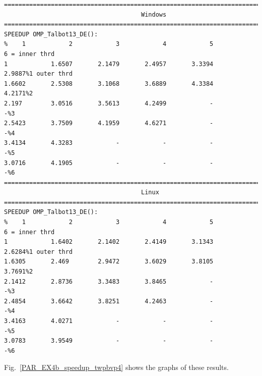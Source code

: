 \documentclass[a4paper,10pt]{report}%
\begin{document}
\begin{lstlisting}
====================================================================================
                                      Windows
====================================================================================
SPEEDUP OMP_Talbot13_DE():
%    1            2            3            4            5            6 = inner thrd
1            1.6507       2.1479       2.4957       3.3394       2.9887%1 outer thrd
1.6602       2.5308       3.1068       3.6889       4.3384       4.2171%2
2.197        3.0516       3.5613       4.2499            -            -%3
2.5423       3.7509       4.1959       4.6271            -            -%4
3.4134       4.3283            -            -            -            -%5
3.0716       4.1905            -            -            -            -%6
====================================================================================
                                      Linux
====================================================================================
SPEEDUP OMP_Talbot13_DE():
%    1            2            3            4            5            6 = inner thrd
1            1.6402       2.1402       2.4149       3.1343       2.6284%1 outer thrd
1.6305       2.469        2.9472       3.6029       3.8105       3.7691%2
2.1412       2.8736       3.3483       3.8465            -            -%3
2.4854       3.6642       3.8251       4.2463            -            -%4
3.4163       4.0271            -            -            -            -%5
3.0783       3.9549            -            -            -            -%6
\end{lstlisting}
Fig.~\ref{PAR_EX4b_speedup_twpbvp4} shows the graphs of these results.
\end{document}
